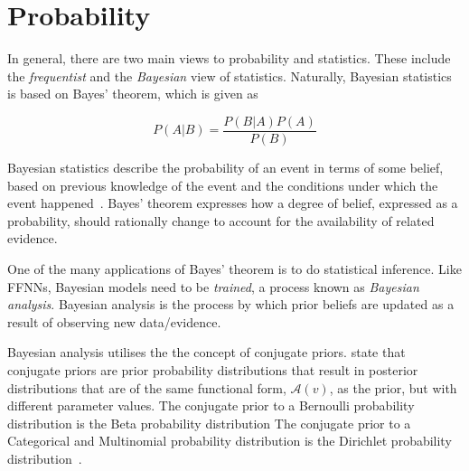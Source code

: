 \section{Probability}
\label{sec:probability}

In general, there are two main views to probability and statistics. These include the \textit{frequentist} and the \textit{Bayesian} view of statistics. Naturally, Bayesian statistics is based on Bayes' theorem, which is given as

\begin{equation}
	\label{eq:bayes}
	P(A \vert B) = \frac{P(B \vert A)P(A)}{P(B)}
\end{equation}

Bayesian statistics describe the probability of an event in terms of some belief, based on previous knowledge of the event and the conditions under which the event happened~\cite{ref:hackenberger:2019}. Bayes' theorem expresses how a degree of belief, expressed as a probability, should rationally change to account for the availability of related evidence.

One of the many applications of Bayes' theorem is to do statistical inference. Like \acp{FFNN}, Bayesian models need to be \textit{trained}, a process known as \textit{Bayesian analysis}. Bayesian analysis is the process by which prior beliefs are updated as a result of observing new data/evidence.

Bayesian analysis utilises the the concept of conjugate priors. \citeauthor{ref:wackerly:2014}\cite{ref:wackerly:2014} state that conjugate priors are prior probability distributions that result in posterior distributions that are of the same functional form, $\mathcal{A}(v)$, as the prior, but with different parameter values. The conjugate prior to a Bernoulli probability distribution is the Beta probability distribution The conjugate prior to a Categorical and Multinomial probability distribution is the Dirichlet probability distribution~\cite{ref:wackerly:2014}.
